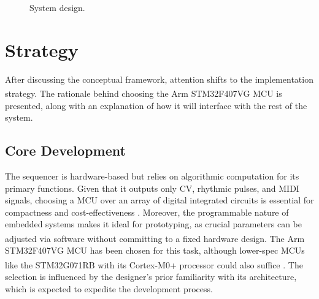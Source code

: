 \documentclass[12pt]{article}
\numberwithin{subsubsubsection}{subsubsection}
\begin{document}
\begin{figure}[ht]
    \centering
    \caption{System design.}
    \label{fig:system}
\end{figure}

\section{Strategy}

After discussing the conceptual framework, attention shifts to the implementation strategy. The rationale behind choosing the Arm\textsuperscript{\textregistered} STM32F407VG MCU is presented, along with an explanation of how it will interface with the rest of the system.

\subsection{Core Development}

 The sequencer is hardware-based but relies on algorithmic computation for its primary functions. Given that it outputs only CV, rhythmic pulses, and MIDI signals, choosing a MCU over an array of digital integrated circuits is essential for compactness and cost-effectiveness \cite{Barlett}. Moreover, the programmable nature of embedded systems makes it ideal for prototyping, as crucial parameters can be adjusted via software without committing to a fixed hardware design. The Arm\textsuperscript{\textregistered} STM32F407VG MCU has been chosen for this task, although lower-spec MCUs like the STM32G071RB with its Cortex\textsuperscript{\textregistered}-M0+ processor could also suffice \cite{Yiu}. The selection is influenced by the designer's prior familiarity with its architecture, which is expected to expedite the development process.
\end{document}

